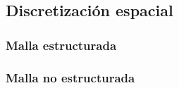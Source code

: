 
\subsection{Discretización espacial}
	\subsubsection{Malla estructurada}
	\subsubsection{Malla no estructurada}